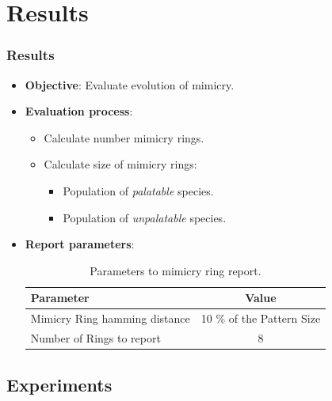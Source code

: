 \section{Results}

\frame
{
	\frametitle{Results}

	\begin{itemize}
	  \item \textbf{Objective}: Evaluate evolution of mimicry.
	  \item \textbf{Evaluation process}:
			\begin{itemize}
			  \item Calculate number mimicry rings.
			  \item Calculate size of mimicry rings:
					\begin{itemize}
					  \item Population of \textit{palatable} species.
					  \item Population of \textit{unpalatable} species.
					\end{itemize}			  
			\end{itemize}
		\item \textbf{Report parameters}:
			\begin{table}
			\centering
			\begin{scriptsize}
			\begin{spacing}{1.5}
			\begin{tabular}{| l | c |}
				\hline
					\textbf{Parameter} & \textbf{Value} \\ \hline
					Mimicry Ring hamming distance & 10 \% of the Pattern Size \\ \hline
					Number of Rings to report & 8 \\
				\hline
			\end{tabular}
			\end{spacing}
			\end{scriptsize}
			\caption{Parameters to mimicry ring report.}
			\label{tab:ring-report-control-parameters}
			\end{table}		
	\end{itemize}
}

\subsection{Experiments}


